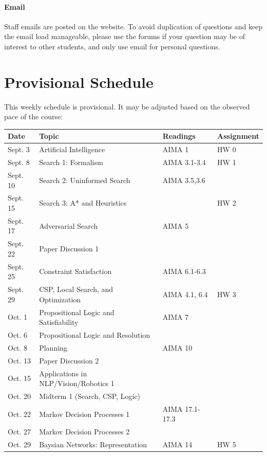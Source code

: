 \documentclass[11pt]{article}
\begin{document}
\paragraph{Email} Staff emails are posted on the website. To avoid
duplication of questions and keep the email load manageable, please
use the forums if your question may be of interest to other students,
and only use email for personal questions.

\section{Provisional Schedule}

This weekly schedule is provisional. It may be adjusted based on the observed pace of the course:
\vspace {0.25cm}

 \begin{center}
\begin{tabular}{llll}
\toprule
Date &Topic &Readings &Assignment \\
\midrule
 Sept. 3 & Artificial Intelligence  & AIMA 1 &HW 0 \\
 Sept. 8 &Search 1: Formalism & AIMA 3.1-3.4  &HW 1 \\
 Sept. 10 & Search 2: Uninformed Search  & AIMA 3.5,3.6 & \\
 Sept. 15 & Search 3: A* and Heuristics & &HW 2 \\
 Sept. 17 &Adversarial Search &AIMA 5 & \\
 Sept. 22 & Paper Discussion 1  & & \\
 Sept. 25 &Constraint Satisfaction &AIMA 6.1-6.3 & \\ 
 Sept. 29 &CSP, Local Search, and Optimization &AIMA 4.1, 6.4 & HW 3 \\ 
 Oct. 1 & Propositional Logic and Satisfiability &AIMA 7 &  \\
 Oct. 6 & Propositional Logic and Resolution &  & \\ 
 Oct. 8 & Planning & AIMA 10 & \\ 
 Oct. 13 & Paper Discussion 2 & & \\
 Oct. 15 & Applications in NLP/Vision/Robotics 1 & & \\
 Oct. 20 & Midterm 1 (Search, CSP, Logic) & & \\
 Oct. 22 & Markov Decision Processes 1 &AIMA 17.1-17.3 & \\
 Oct. 27 & Markov Decision Processes 2  & & \\
 Oct. 29 & Baysian Networks: Representation &AIMA 14 &HW 5 \\

\end{tabular}
\end{center}
\end{document}
